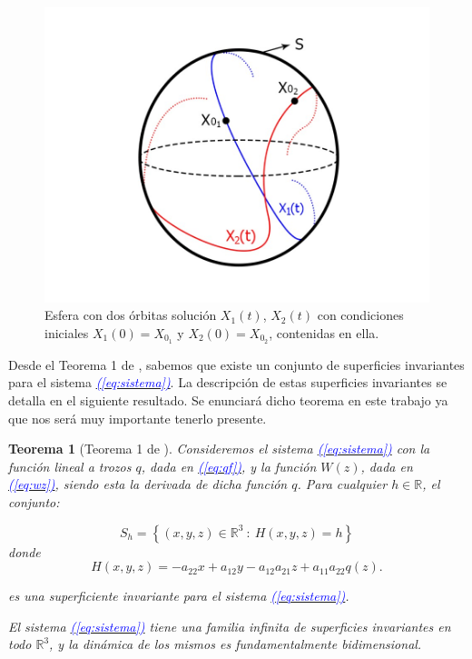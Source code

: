 \documentclass[12pt,a4paper]{report} %
\newtheorem{theorem}{Teorema}[chapter]
\newcommand{\eref}[1]{\hyperref[#1]{\textcolor{blue}{\textit{(\ref*{#1})}}}}
\begin{document}
	\begin{figure}[h]
		\centering
		\includegraphics[width=1\textwidth]{esfera.jpg}
		\caption{Esfera con dos órbitas solución $X_1(t)$, $X_2(t)$ con condiciones iniciales $X_1(0)=X_{0_1}$ y $X_2(0)=X_{0_2}$, contenidas en ella.}
		\label{fig:esfera}
	\end{figure}\smallskip
	\newpage
	
	Desde el Teorema 1 de \cite{ponce}, sabemos que existe un conjunto de superficies invariantes para el sistema \eref{eq:sistema}. La descripción de estas superficies invariantes se detalla en el siguiente resultado. Se enunciará dicho teorema en este trabajo ya que nos será muy importante tenerlo presente.

	\begin{theorem}[Teorema 1 de \cite{ponce}]
		\label{teorema1}
		Consideremos el sistema \eref{eq:sistema} con la función lineal a trozos $q$, dada en \eref{eq:qf}, y la función $W(z)$, dada en \eref{eq:wz}, siendo esta la derivada de dicha función $q$. Para cualquier $h \in \mathbb{R}$, el conjunto:
		
		\begin{equation}
			\label{eq:sh}
			S_h=\left\{(x,y,z)\in \mathbb{R}^3\: : \: H(x,y,z)=h \right\}
		\end{equation}
		donde
		\begin{equation}
			\label{eq:hecuation}
			H(x,y,z)=-a_{22}x+a_{12}y-a_{12}a_{21}z+a_{11}a_{22}q(z).
		\end{equation}\smallskip
		
		\noindent es una superficiente invariante para el sistema \eref{eq:sistema}.
		
		\vspace{0.5cm}\noindent El sistema \eref{eq:sistema} tiene una familia infinita de superficies invariantes en todo $\mathbb{R}^3$, y la dinámica de los mismos es fundamentalmente bidimensional.
	\end{theorem}
	
\end{document}
